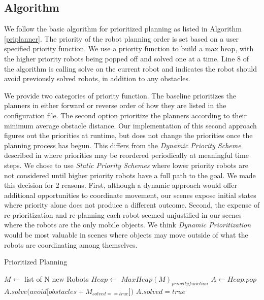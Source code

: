 \documentclass[12pt,journal,compsoc]{IEEEtran}
\begin{document}
\subsection{Algorithm}
We follow the basic algorithm for prioritized planning as listed in Algorithm \ref{priplanner}. The priority of the robot planning order is set based on a user specified priority function. We use a priority function to build a max heap, with the higher priority robots being popped off and solved one at a time. Line 8 of the algorithm is calling solve on the current robot and indicates the robot should avoid previously solved robots, in addition to any obstacles.
\par
We provide two categories of priority function. The baseline prioritizes the planners in either forward or reverse order of how they are listed in the configuration file. The second option prioritize the planners according to their minimum average obstacle distance. Our implementation of this second approach figures out the priorities at runtime, but does not change the priorities once the planning process has begun. This differs from the \emph{Dynamic Priority Scheme} described in \cite{slides} where priorities may be reordered periodically at meaningful time steps. We chose to use \emph{Static Priority Schemes} where lower priority robots are not considered until higher priority robots have a full path to the goal. We made this decision for 2 reasons. First, although a dynamic approach would offer additional opportunities to coordinate movement, our scenes expose initial states where priority alone does not produce a different outcome. Second, the expense of re-prioritization and re-planning each robot seemed unjustified in our scenes where the robots are the only mobile objects. We think \emph{Dynamic Prioritization} would be most valuable in scenes where objects may move outside of what the robots are coordinating among themselves.

\begin{algorithm}
\caption{Prioritized Planning}\label{priplanner}
\begin{algorithmic}[1]
\State $M \gets$ list of N new Robots
\State $Heap \gets$ $MaxHeap(M)_{priority function}$
	\State $A \gets Heap.pop$
	\State $A.solve(avoid$[$obstacles + M_{solved==true}$]$)$
	\State $A.solved = true$
\EndWhile
\end{algorithmic}
\end{algorithm}
\end{document}
